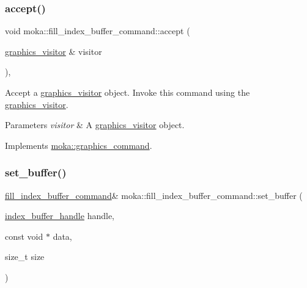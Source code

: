 \subsubsection{\texorpdfstring{accept()}{accept()}}
{\footnotesize\ttfamily void moka\+::fill\+\_\+index\+\_\+buffer\+\_\+command\+::accept (\begin{DoxyParamCaption}\item[{\mbox{\hyperlink{classmoka_1_1graphics__visitor}{graphics\+\_\+visitor}} \&}]{visitor }\end{DoxyParamCaption})\hspace{0.3cm}{\ttfamily [override]}, {\ttfamily [virtual]}}



Accept a \mbox{\hyperlink{classmoka_1_1graphics__visitor}{graphics\+\_\+visitor}} object. Invoke this command using the \mbox{\hyperlink{classmoka_1_1graphics__visitor}{graphics\+\_\+visitor}}. 


\begin{DoxyParams}{Parameters}
{\em visitor} & A \mbox{\hyperlink{classmoka_1_1graphics__visitor}{graphics\+\_\+visitor}} object. \\
\hline
\end{DoxyParams}


Implements \mbox{\hyperlink{classmoka_1_1graphics__command_a7affaeceb1019ab358c62185bce4e654}{moka\+::graphics\+\_\+command}}.

\mbox{\label{classmoka_1_1fill__index__buffer__command_a44916b1b5e00f4df93bbb453098a1251}} 
\subsubsection{\texorpdfstring{set\_buffer()}{set\_buffer()}}
{\footnotesize\ttfamily \mbox{\hyperlink{classmoka_1_1fill__index__buffer__command}{fill\+\_\+index\+\_\+buffer\+\_\+command}}\& moka\+::fill\+\_\+index\+\_\+buffer\+\_\+command\+::set\+\_\+buffer (\begin{DoxyParamCaption}\item[{\mbox{\hyperlink{structmoka_1_1index__buffer__handle}{index\+\_\+buffer\+\_\+handle}}}]{handle,  }\item[{const void $\ast$}]{data,  }\item[{size\+\_\+t}]{size }\end{DoxyParamCaption})}



